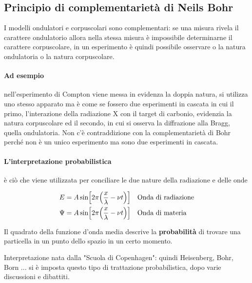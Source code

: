 \subsection{Principio di complementarietà di Neils Bohr}
I modelli ondulatori e corpuscolari sono complementari: se una misura rivela il carattere ondulatorio allora nella stessa misura è impossibile determinarne il carattere corpuscolare, in un esperimento è quindi possibile osservare o la natura ondulatoria o la natura corpuscolare.

\paragraph{Ad esempio} nell'esperimento di Compton viene messa in evidenza la doppia natura, si utilizza uno stesso apparato ma è come se fossero due esperimenti in cascata in cui il primo, l'interazione della radiazione X con il target di carbonio, evidenzia la natura corpuscolare ed il secondo, in cui si osserva la diffrazione alla Bragg, quella ondulatoria.
Non c'è contraddizione con la complementarietà di Bohr perché non è un unico esperimento ma sono due esperimenti in cascata.


\paragraph{L'interpretazione probabilistica} è ciò che viene utilizzata per conciliare le due nature della radiazione e delle onde

\begin{equation}
\begin{split}
E & = A \sin \Bigl[ 2\pi \Bigl(  \frac{ x}{\lambda } - \nu t  \Bigr) \Bigr] \quad \mbox{Onda di radiazione} \\
\Psi & = A \sin \Bigl[ 2\pi \Bigl(  \frac{ x}{\lambda } - \nu t  \Bigr) \Bigr] \quad \mbox{Onda di materia}
\end{split}
\end{equation}

Il quadrato della funzione d'onda media descrive la \textbf{probabilità} di trovare una particella in un punto dello spazio in un certo momento.

Interpretazione nata dalla "Scuola di Copenhagen": quindi Heisenberg, Bohr, Born ...
si è imposta questo tipo di trattazione probabilistica, dopo varie discussioni e dibattiti.


 








